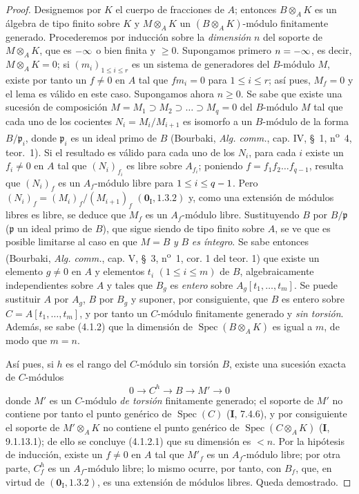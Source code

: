 \begin{proof}
Designemos por $K$ el cuerpo de fracciones de $A$; entonces $B\otimes_AK$ es un
álgebra de tipo finito sobre $K$ y $M\otimes_AK$ un $(B\otimes_AK)$-módulo
finitamente generado. Procederemos por inducción
sobre la \emph{dimensión} $n$ del soporte de
$M\otimes_AK$, que es $-\infty$ o bien finita y $\geq0$. Supongamos primero
$n=-\infty$, es decir, $M\otimes_AK=0$; si $(m_i)_{1\leq i\leq r}$ es
un sistema de generadores del $B$-módulo $M$, existe por tanto un $f\ne0$ en
$A$ tal que $fm_i=0$ para $1\leq i\leq r$; así pues, $M_f=0$ y el lema es válido
en este caso. Supongamos ahora $n\geq0$. Se sabe que existe una sucesión de composición
$M=M_1\supset M_2\supset\ldots\supset M_q=0$ del $B$-módulo $M$
tal que cada uno de los cocientes $N_i=M_i/M_{i+1}$ es isomorfo a un
$B$-módulo de la forma $B/\mathfrak p_i$, donde $\mathfrak p_i$ es un ideal
primo de $B$ (Bourbaki, \emph{Alg. comm.}, cap. IV, \S~1, n\textsuperscript{o}~4, teor.~1).
Si el resultado es válido para cada uno de los $N_i$, para cada $i$ existe un
$f_i\ne0$ en $A$ tal que $(N_i)_{f_i}$ es libre sobre $A_{f_i}$; poniendo
$f=f_1f_2\ldots f_{q-1}$, resulta que $(N_i)_f$ es un $A_f$-módulo
libre para $1\leq i\leq q- 1$. Pero $(N_i)_f=(M_i)_f/(M_{i+1})_f$
$(\mathbf{0}_{\mathrm I},1.3.2)$ y, como una extensión de módulos libres es libre,
se deduce que $M_f$ es un $A_f$-módulo libre. Sustituyendo $B$ por
$B/\mathfrak p$ ($\mathfrak p$ un ideal primo de $B$), que sigue siendo de tipo
finito sobre $A$, se ve que es posible limitarse al caso en que $M=B$ \emph{y} $B$ \emph{es íntegro}.
Se sabe entonces (Bourbaki, \emph{Alg. comm.}, cap. V, \S~3, n\textsuperscript{o}~1, cor. 1 del
teor. 1) que existe un elemento $g\ne0$ en $A$ y elementos $t_i$
$(1\leq i\leq m)$ de $B$, algebraicamente independientes sobre $A$ y tales que
$B_g$ es \emph{entero} sobre $A_g[t_1,\ldots,t_m]$. Se puede sustituir $A$ por $A_g$,
$B$ por $B_g$ y suponer, por consiguiente, que $B$ es entero sobre
$C=A[t_1,\ldots,t_m]$, y por tanto un $C$-módulo finitamente generado y \emph{sin torsión}. Además,
se sabe (4.1.2) que la dimensión de $\operatorname{Spec}(B\otimes_AK)$ es
igual a $m$, de modo que $m=n$.

Así pues, si $h$ es el rango del $C$-módulo sin torsión $B$, existe una
sucesión exacta de $C$-módulos
\[
0\longrightarrow C^h\longrightarrow B\longrightarrow M'\longrightarrow0
\]
donde $M'$ es un $C$-módulo \emph{de torsión} finitamente generado; el soporte de $M'$ no
contiene por tanto el punto genérico de $\operatorname{Spec}(C)$ (\textbf I, 7.4.6),
y por consiguiente el soporte de $M'\otimes_AK$ no contiene el punto genérico
de $\operatorname{Spec}(C\otimes_AK)$ (\textbf I, 9.1.13.1); de ello se concluye (4.1.2.1)
que su dimensión es $<n$. Por la hipótesis de inducción, existe un
$f\ne0$ en $A$ tal que $M'_f$ es un $A_f$-módulo libre; por otra parte,
$C_f^h$ es un $A_f$-módulo libre; lo mismo ocurre, por tanto, con $B_f$, que,
en virtud de $(\mathbf{0}_{\mathrm I},1.3.2)$, es una extensión de módulos libres. Queda demostrado.
\end{proof}
